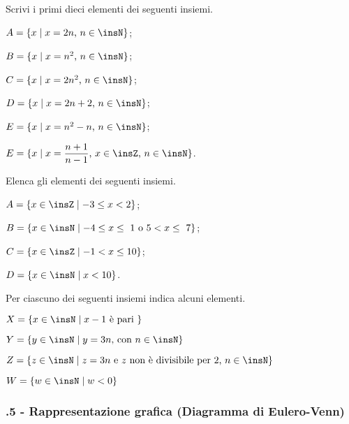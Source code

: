 \begin{esercizio}
\label{ese:\thechapter.30}
Scrivi i primi dieci elementi dei seguenti insiemi.
\begin{enumeratea}
\spazielenx
\item $A=\{x\mid x=2n\text{, }n\in\insN\}$;
\item $B=\{x\mid x=n^{2}\text{, }n\in\insN\}$;
\item $C=\{x\mid x=2n^{2}\text{, }n\in\insN\}$;
\item $D=\{x\mid x=2n+2\text{, }n\in\insN\}$;
\item $E=\{x\mid x=n^{2}-n\text{, }n\in\insN\}$;
\item $E=\{x\mid x=\dfrac{n+1}{n-1}\text{, }x\in\insZ\text{, }n\in\insN\}$.
\end{enumeratea}
\end{esercizio}

\begin{esercizio}
\label{ese:\thechapter.31}
Elenca gli elementi dei seguenti insiemi.
\begin{multicols}{2}
\begin{enumeratea}
\item $A=\{x\in\insZ\mid -3\le x<2\}$;
\item $B=\{x\in\insN\mid -4\le x\le~1\text{ o }5<x\le~7\}$;
\item $C=\{x\in\insZ\mid -1< x\le 10\}$;
\item $D=\{x\in\insN\mid x<10\}$.
\end{enumeratea}
\end{multicols}
\end{esercizio}

\begin{esercizio}
\label{ese:\thechapter.32}
Per ciascuno dei seguenti insiemi indica alcuni elementi.
\TabPositions{6cm}
\begin{enumeratea}
\item $X=\{x\in\insN\mid x-1\text{ è pari }\}$\dotfill
\item $Y=\{y\in\insN\mid y=3n\text{, con } n\in\insN\}$\dotfill
\item $Z=\{z\in\insN\mid z=3n\text{ e } z\text{ non è divisibile per~2, }n\in\insN\}$\dotfill
\item $W=\{w\in\insN\mid w<0\}$\dotfill
\end{enumeratea}
\end{esercizio}

\subsubsection*{\thechapter.5 - Rappresentazione grafica (Diagramma di Eulero-Venn)}

